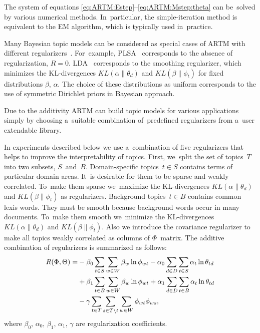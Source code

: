\documentclass{sig-alternate}
\begin{document}
The system of equations \eqref{eq:ARTM:Estep}--\eqref{eq:ARTM:Mstep:theta}
can be~solved by various numerical methods.
In~particular,
the simple-iteration method is equivalent to the EM algorithm,
which is typically used in~practice.

Many Bayesian topic models can be considered
as special cases of ARTM with different regularizers~\cite{voron14aist}. %
For~example,
PLSA~\cite{hofmann99plsi} corresponds to the absence of regularization, ${R=0}$.
LDA~\cite{blei03latent} corresponds to the smoothing regularizer,
which minimizes the KL-divergences
$KL(\alpha\|\theta_d)$ and
$KL(\beta\|\phi_t)$
for fixed distributions $\beta$, $\alpha$.
The choice of these distributions as uniform
corresponds to the use of symmetric Dirichlet priors in Bayesian approach.

Due to the additivity ARTM can build topic models for various applications
simply by choosing a~suitable combination of~predefined regularizers
from a~user extendable library.

In experiments described below we use a~combination of five regularizers
that helps to improve the interpretability of topics.
First, we~split the set of topics~$T$ into two subsets, $S$~and~$B$.
Domain-specific topics~${t\in S}$ contains terms of particular domain areas.
It~is desirable for them to be sparse and weakly correlated.
To~make them sparse we~maximize the KL-divergences
$KL(\alpha\|\theta_d)$ and
$KL(\beta\|\phi_t)$ as regularizers.
Background topics~${t\in B}$ contains common lexis words.
They must be smooth because background words occur in many documents.
To~make them smooth we~minimize the KL-divergences
$KL(\alpha\|\theta_d)$ and
$KL(\beta\|\phi_t)$.
Also we introduce the covariance regularizer
to make all topics weakly correlated as columns of $\Phi$~matrix.
The additive combination of regularizers is summarized as follows:
\begin{align*}
    R(\Phi,\Theta)
    =&
    - \beta_0 \sum_{t\in S} \sum_{w\in W} \beta_w \ln \phi_{wt}
    - \alpha_0 \sum_{d\in D} \sum_{t\in S} \alpha_t \ln \theta_{td}
    \notag
\\  {}&
    + \beta_1 \sum_{t\in B} \sum_{w\in W} \beta_w \ln \phi_{wt}
    + \alpha_1 \sum_{d\in D} \sum_{t\in B} \alpha_t \ln \theta_{td}
\\  {}&
    - \gamma
        \sum_{t\in T}
        \sum_{s\in T\backslash t}
        \sum_{w\in W} \phi_{wt}\phi_{ws},
\end{align*}
where $\beta_0$, $\alpha_0$, $\beta_1$, $\alpha_1$, $\gamma$
are regularization coefficients.
\end{document}
